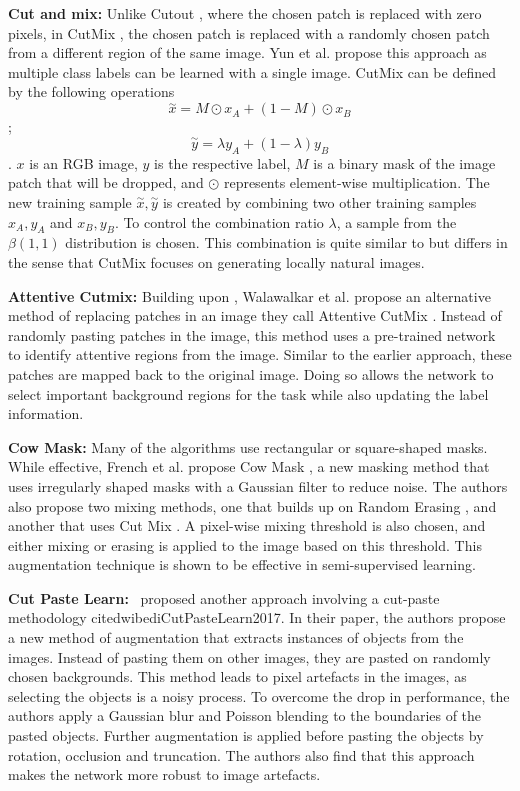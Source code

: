 \textbf{Cut and mix: }
Unlike Cutout \cite{devriesImprovedRegularizationConvolutional2017}, where the chosen patch is replaced with zero pixels, in CutMix \cite{yunCutMixRegularizationStrategy2019}, the chosen patch is replaced with a randomly chosen patch from a different region of the same image. Yun et al. propose this approach as multiple class labels can be learned with a single image.
CutMix can be defined by the following operations $$\overset{\sim}x = M \odot x_{A} + (1-M) \odot x_{B}$$ ; $$\overset{\sim}y = \lambda y_{A}+ (1- \lambda)y_{B}$$. $x$ is an RGB image, $y$ is the respective label, $M$ is a binary mask of the image patch that will be dropped, and $\odot$ represents element-wise multiplication. The new training sample $\overset{\sim}x , \overset{\sim}y$ is created by combining two other training samples $x_{A}, y_{A}$ and $x_{B} , y_{B}$. To control the combination ratio $\lambda$, a sample from the $\beta(1,1)$ distribution is chosen. This combination is quite similar to \cite{zhangMixupEmpiricalRisk2018} but differs in the sense that CutMix focuses on generating locally natural images.

\textbf{Attentive Cutmix: }
Building upon \cite{yunCutMixRegularizationStrategy2019}, Walawalkar et al. propose an alternative method of replacing patches in an image they call Attentive CutMix \cite{walawalkarAttentiveCutMixEnhanced2020}. Instead of randomly pasting patches in the image, this method uses a pre-trained network to identify attentive regions from the image. Similar to the earlier approach, these patches are mapped back to the original image. Doing so allows the network to select important background regions for the task while also updating the label information.

\textbf{Cow Mask: }
Many of the algorithms use rectangular or square-shaped masks. While effective, French et al. propose Cow Mask \cite{frenchMilkingCowMaskSemiSupervised2020}, a new masking method that uses irregularly shaped masks with a Gaussian filter to reduce noise. The authors also propose two mixing methods, one that builds up on Random Erasing \cite{zhongRandomErasingData2020}, and another that uses Cut Mix \cite{yunCutMixRegularizationStrategy2019}. A pixel-wise mixing threshold is also chosen, and either mixing or erasing is applied to the image based on this threshold. This augmentation technique is shown to be effective in semi-supervised learning.

\textbf{Cut Paste Learn: }
\ proposed another approach involving a cut-paste methodology cite{dwibediCutPasteLearn2017}. In their paper, the authors propose a new method of augmentation that extracts instances of objects from the images. Instead of pasting them on other images, they are pasted on randomly chosen backgrounds. This method leads to pixel artefacts in the images, as selecting the objects is a noisy process. To overcome the drop in performance, the authors apply a Gaussian blur and Poisson blending to the boundaries of the pasted objects. Further augmentation is applied before pasting the objects by rotation, occlusion and truncation. The authors also find that this approach makes the network more robust to image artefacts.


